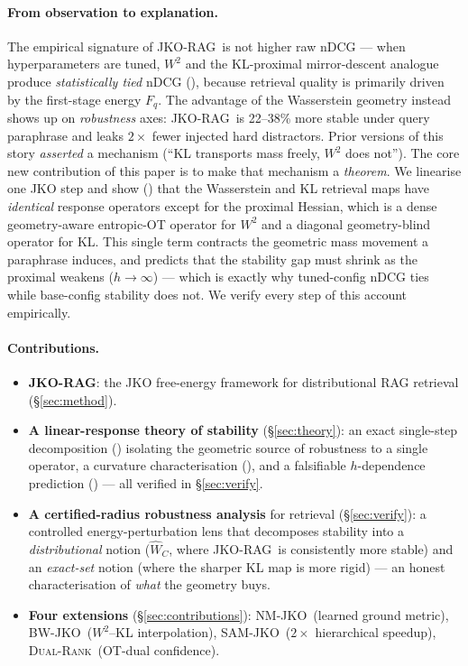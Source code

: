 \documentclass{article}
\theoremstyle{plain}
\newcommand{\mWdist}{\widehat{W}_C}
\newcommand{\jko}{\textsc{JKO-RAG}}
\newcommand{\bwjko}{\textsc{BW-JKO}}
\newcommand{\nmjko}{\textsc{NM-JKO}}
\newcommand{\samjko}{\textsc{SAM-JKO}}
\newcommand{\dualrank}{\textsc{Dual-Rank}}
\begin{document}
\paragraph{From observation to explanation.}
The empirical signature of \jko\ is not higher raw nDCG --- when hyperparameters are tuned, $W^2$ and the KL-proximal mirror-descent analogue produce \emph{statistically tied} nDCG (), because retrieval quality is primarily driven by the first-stage energy $F_q$. The advantage of the Wasserstein geometry instead shows up on \emph{robustness} axes: \jko\ is 22--38\% more stable under query paraphrase and leaks $2\times$ fewer injected hard distractors. Prior versions of this story \emph{asserted} a mechanism (``KL transports mass freely, $W^2$ does not''). The core new contribution of this paper is to make that mechanism a \emph{theorem}. We linearise one JKO step and show () that the Wasserstein and KL retrieval maps have \emph{identical} response operators except for the proximal Hessian, which is a dense geometry-aware entropic-OT operator for $W^2$ and a diagonal geometry-blind operator for KL. This single term contracts the geometric mass movement a paraphrase induces, and predicts that the stability gap must shrink as the proximal weakens ($h\to\infty$) --- which is exactly why tuned-config nDCG ties while base-config stability does not. We verify every step of this account empirically.

\paragraph{Contributions.}
\begin{itemize}
  \item \textbf{\jko}: the JKO free-energy framework for distributional RAG retrieval (\S\ref{sec:method}).
  \item \textbf{A linear-response theory of stability} (\S\ref{sec:theory}): an exact single-step decomposition () isolating the geometric source of robustness to a single operator, a curvature characterisation (), and a falsifiable $h$-dependence prediction () --- all verified in \S\ref{sec:verify}.
  \item \textbf{A certified-radius robustness analysis} for retrieval (\S\ref{sec:verify}): a controlled energy-perturbation lens that decomposes stability into a \emph{distributional} notion ($\mWdist$, where \jko\ is consistently more stable) and an \emph{exact-set} notion (where the sharper KL map is more rigid) --- an honest characterisation of \emph{what} the geometry buys.
  \item \textbf{Four extensions} (\S\ref{sec:contributions}): \nmjko\ (learned ground metric), \bwjko\ ($W^2$--KL interpolation), \samjko\ ($2\times$ hierarchical speedup), \dualrank\ (OT-dual confidence).
\end{itemize}
\end{document}
